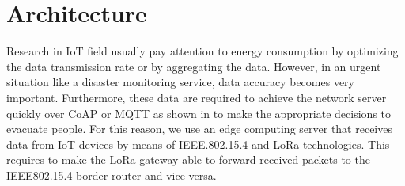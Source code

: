 \section{Architecture} \label{sec:Approach}

Research in \ac{IoT} field usually pay attention to energy consumption by optimizing the data transmission rate or by aggregating the data.
However,
	in an urgent situation like a disaster monitoring service,
	data accuracy becomes very important.
Furthermore,
	these data are required to achieve the network server quickly over \ac{CoAP} or \ac{MQTT} as shown in  to make the appropriate decisions to evacuate people.
For this reason,
	we use an edge computing server that receives data from \ac{IoT} devices by means of IEEE.802.15.4 and LoRa technologies.
This requires to make the LoRa gateway able to forward received packets to the IEEE802.15.4 border router and vice versa.



